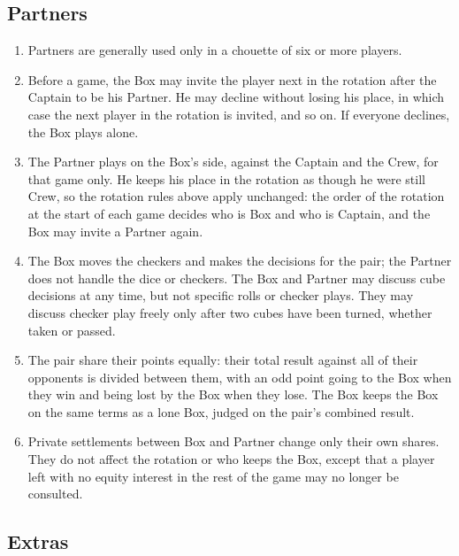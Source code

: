 \documentclass[11pt]{article}
\begin{document}
\subsection*{Partners}

\begin{enumerate}
\item Partners are generally used only in a chouette of six or more
  players.

\item Before a game, the Box may invite the player next in the rotation
  after the Captain to be his Partner.  He may decline without losing
  his place, in which case the next player in the rotation is invited,
  and so on.  If everyone declines, the Box plays alone.

\item The Partner plays on the Box's side, against the Captain and the
  Crew, for that game only.  He keeps his place in the rotation as
  though he were still Crew, so the rotation rules above apply
  unchanged: the order of the rotation at the start of each game
  decides who is Box and who is Captain, and the Box may invite a
  Partner again.

\item The Box moves the checkers and makes the decisions for the pair;
  the Partner does not handle the dice or checkers.  The Box and
  Partner may discuss cube decisions at any time, but not specific
  rolls or checker plays.  They may discuss checker play freely only
  after two cubes have been turned, whether taken or passed.

\item The pair share their points equally: their total result against all
  of their opponents is divided between them, with an odd point going to
  the Box when they win and being lost by the Box when they lose.  The Box
  keeps the Box on the same terms as a lone Box, judged on the pair's
  combined result.

\item Private settlements between Box and Partner change only their own
  shares.  They do not affect the rotation or who keeps the Box, except
  that a player left with no equity interest in the rest of the game
  may no longer be consulted.
\end{enumerate}

\subsection*{Extras}
\end{document}
